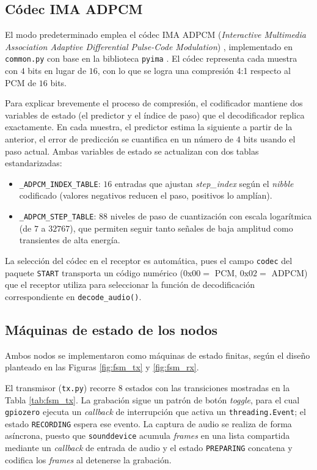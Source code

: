 \subsection{Códec IMA ADPCM}

El modo predeterminado emplea el códec IMA ADPCM (\textit{Interactive Multimedia Association Adaptive Differential Pulse-Code Modulation}) \cite{ima_adpcm1992}, implementado en \texttt{common.py} con base en la biblioteca \texttt{pyima} \cite{pyima}.
El códec representa cada muestra con $4$ bits en lugar de $16$, con lo que se logra una compresión 4:1 respecto al PCM de $16$ bits.

Para explicar brevemente el proceso de compresión, el codificador mantiene dos variables de estado (el predictor y el índice de paso) que el decodificador replica exactamente.
En cada muestra, el predictor estima la siguiente a partir de la anterior, el error de predicción se cuantifica en un número de $4$ bits usando el paso actual.
Ambas variables de estado se actualizan con dos tablas estandarizadas:
\begin{itemize}
    \item \texttt{\_ADPCM\_INDEX\_TABLE}: $16$ entradas que ajustan \textit{step\_index} según el \textit{nibble} codificado (valores negativos reducen el paso, positivos lo amplían).
    \item \texttt{\_ADPCM\_STEP\_TABLE}: $88$ niveles de paso de cuantización con escala logarítmica (de $7$ a $32767$), que permiten seguir tanto señales de baja amplitud como transientes de alta energía.
\end{itemize}

La selección del códec en el receptor es automática, pues el campo \texttt{codec} del paquete \texttt{START} transporta un código numérico ($0\mathrm{x}00=$ PCM, $0\mathrm{x}02=$ ADPCM) que el receptor utiliza para seleccionar la función de decodificación correspondiente en \texttt{decode\_audio()}.

\subsection{Máquinas de estado de los nodos}

Ambos nodos se implementaron como máquinas de estado finitas, según el diseño planteado en las Figuras \ref{fig:fsm_tx} y \ref{fig:fsm_rx}.

El transmisor (\texttt{tx.py}) recorre $8$ estados con las transiciones mostradas en la Tabla \ref{tab:fsm_tx}.
La grabación sigue un patrón de botón \textit{toggle}, para el cual \texttt{gpiozero} ejecuta un \textit{callback} de interrupción que activa un \texttt{threading.Event}; el estado \texttt{RECORDING} espera ese evento.
La captura de audio se realiza de forma asíncrona, puesto que \texttt{sounddevice} acumula \textit{frames} en una lista compartida mediante un \textit{callback} de entrada de audio y el estado \texttt{PREPARING} concatena y codifica los \textit{frames} al detenerse la grabación.

